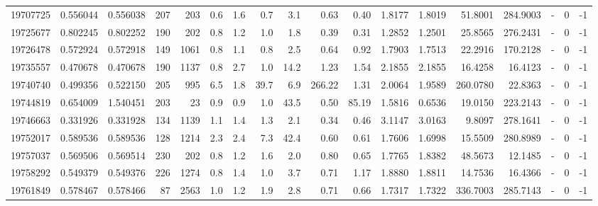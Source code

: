 \begin{tabular}{rrrrrrrrrrrrrrrlrr}
  19707725 & 0.556044 &   0.556038 &  207 &  203 &      0.6 &      1.6 &     0.7 &      3.1 &       0.63 &        0.40 &  1.8177 &  1.8019 &   51.8001 &  284.9003 &             - &        0 &         -1 \\
  19725677 & 0.802245 &   0.802252 &  190 &  202 &      0.8 &      1.2 &     1.0 &      1.8 &       0.39 &        0.31 &  1.2852 &  1.2501 &   25.8565 &  276.2431 &             - &        0 &         -1 \\
  19726478 & 0.572924 &   0.572918 &  149 & 1061 &      0.8 &      1.1 &     0.8 &      2.5 &       0.64 &        0.92 &  1.7903 &  1.7513 &   22.2916 &  170.2128 &             - &        0 &         -1 \\
  19735557 & 0.470678 &   0.470678 &  190 & 1137 &      0.8 &      2.7 &     1.0 &     14.2 &       1.23 &        1.54 &  2.1855 &  2.1855 &   16.4258 &   16.4123 &             - &        0 &         -1 \\
  19740740 & 0.499356 &   0.522150 &  205 &  995 &      6.5 &      1.8 &    39.7 &      6.9 &     266.22 &        1.31 &  2.0064 &  1.9589 &  260.0780 &   22.8363 &             - &        0 &         -1 \\
  19744819 & 0.654009 &   1.540451 &  203 &   23 &      0.9 &      0.9 &     1.0 &     43.5 &       0.50 &       85.19 &  1.5816 &  0.6536 &   19.0150 &  223.2143 &             - &        0 &         -1 \\
  19746663 & 0.331926 &   0.331928 &  134 & 1139 &      1.1 &      1.4 &     1.3 &      2.1 &       0.34 &        0.46 &  3.1147 &  3.0163 &    9.8097 &  278.1641 &             - &        0 &         -1 \\
  19752017 & 0.589536 &   0.589536 &  128 & 1214 &      2.3 &      2.4 &     7.3 &     42.4 &       0.60 &        0.61 &  1.7606 &  1.6998 &   15.5509 &  280.8989 &             - &        0 &         -1 \\
  19757037 & 0.569506 &   0.569514 &  230 &  202 &      0.8 &      1.2 &     1.6 &      2.0 &       0.80 &        0.65 &  1.7765 &  1.8382 &   48.5673 &   12.1485 &             - &        0 &         -1 \\
  19758292 & 0.549379 &   0.549376 &  226 & 1274 &      0.8 &      1.4 &     1.0 &      3.7 &       0.71 &        1.17 &  1.8880 &  1.8811 &   14.7536 &   16.4366 &             - &        0 &         -1 \\
  19761849 & 0.578467 &   0.578466 &   87 & 2563 &      1.0 &      1.2 &     1.9 &      2.8 &       0.71 &        0.66 &  1.7317 &  1.7322 &  336.7003 &  285.7143 &             - &        0 &         -1 \\

\end{tabular}

